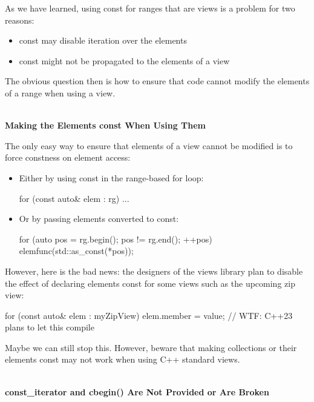As we have learned, using const for ranges that are views is a problem for two reasons:

\begin{itemize}
\item
const may disable iteration over the elements

\item
const might not be propagated to the elements of a view
\end{itemize}

The obvious question then is how to ensure that code cannot modify the elements of a range when using a view.

\noindent
\hspace*{\fill} \\ %
\textbf{Making the Elements const When Using Them}

The only easy way to ensure that elements of a view cannot be modified is to force constness on element access:

\begin{itemize}
\item
Either by using const in the range-based for loop:

\begin{cpp}
for (const auto& elem : rg) {
	...
}
\end{cpp}

\item
Or by passing elements converted to const:

\begin{cpp}
for (auto pos = rg.begin(); pos != rg.end(); ++pos) {
	elemfunc(std::as_const(*pos));
}
\end{cpp}
\end{itemize}

However, here is the bad news: the designers of the views library plan to disable the effect of declaring elements const for some views such as the upcoming zip view:

\begin{cpp}
for (const auto& elem : myZipView) {
	elem.member = value; // WTF: C++23 plans to let this compile
}
\end{cpp}

Maybe we can still stop this. However, beware that making collections or their elements const may not work when using C++ standard views.

\noindent
\hspace*{\fill} \\ %
\textbf{const\_iterator and cbegin() Are Not Provided or Are Broken}

